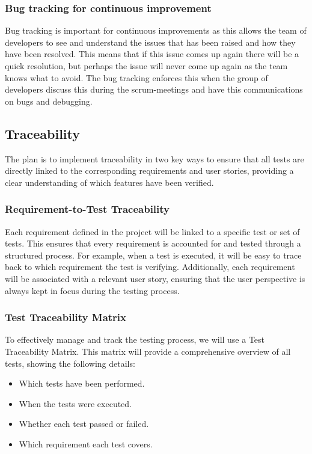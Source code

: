 \documentclass{article}
\begin{document}
\subsubsection{Bug tracking for continuous improvement}
Bug tracking is important for continuous improvements as this allows the team of developers to see and understand the issues that has been raised and how they have been resolved. This means that if this issue comes up again there will be a quick resolution, but perhaps the issue will never come up again as the team knows what to avoid. The bug tracking enforces this when the group of developers discuss this during the scrum-meetings and have this communications on bugs and debugging.


\subsection{Traceability}
The plan is to implement traceability in two key ways to ensure that all tests are directly linked to the corresponding requirements and user stories, providing a clear understanding of which features have been verified.

\subsubsection{Requirement-to-Test Traceability} Each requirement defined in the project will be linked to a specific test or set of tests. This ensures that every requirement is accounted for and tested through a structured process. For example, when a test is executed, it will be easy to trace back to which requirement the test is verifying. Additionally, each requirement will be associated with a relevant user story, ensuring that the user perspective is always kept in focus during the testing process.

\subsubsection{Test Traceability Matrix} To effectively manage and track the testing process, we will use a Test Traceability Matrix. This matrix will provide a comprehensive overview of all tests, showing the following details:

\begin{itemize}
    \item Which tests have been performed.
    \item When the tests were executed.
    \item Whether each test passed or failed.
    \item Which requirement each test covers.
\end{itemize}
\end{document}
